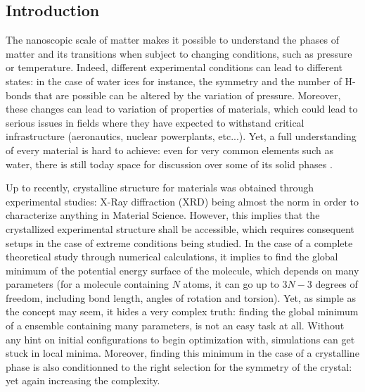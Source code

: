 \documentclass[11pt]{article}
\begin{document}
\begin{multicols}{2}
\section*{Introduction}

The nanoscopic scale of matter makes it possible to understand the phases of matter and its transitions when subject to changing conditions, such as pressure or temperature. Indeed, different experimental conditions can lead to different states: in the case of water ices for instance, the symmetry and the number of H-bonds that are possible can be altered by the variation of pressure. Moreover, these changes can lead to variation of properties of materials, which could lead to serious issues in fields where they have expected to withstand critical infrastructure (aeronautics, nuclear powerplants, etc...). Yet, a full understanding of every material is hard to achieve: even for very common elements such as water, there is still today space for discussion over some of its solid phases \cite{Hansen2021-bk}.

Up to recently, crystalline structure for materials was obtained through experimental studies: X-Ray diffraction (XRD) being almost the norm in order to characterize anything in Material Science. However, this implies that the crystallized experimental structure shall be accessible, which requires consequent setups in the case of extreme conditions being studied. In the case of a complete theoretical study through numerical calculations, it implies to find the global minimum of the potential energy surface of the molecule, which depends on many parameters (for a molecule containing $N$ atoms, it can go up to $3N-3$ degrees of freedom, including bond length, angles of rotation and torsion). Yet, as simple as the concept may seem, it hides a very complex truth: finding the global minimum of a ensemble containing many parameters, is not an easy task at all. Without any hint on initial configurations to begin optimization with, simulations can get stuck in local minima. Moreover, finding this minimum in the case of a crystalline phase is also conditionned to the right selection for the symmetry of the crystal: yet again increasing the complexity.\vspace{1em}


\end{multicols}
\end{document}
